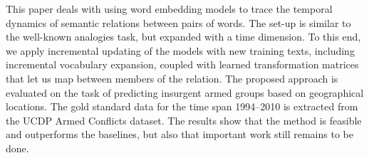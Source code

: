This paper deals with using word embedding models to trace the temporal dynamics of semantic relations between pairs of words. The set-up is similar to the well-known analogies task, but expanded with a time dimension. To this end, we apply incremental updating of the models with new training texts, including incremental vocabulary expansion, coupled with learned transformation matrices that let us map between members of the relation. The proposed approach is evaluated on the task of predicting insurgent armed groups based on geographical locations. The gold standard data for the time span 1994--2010 is extracted from the UCDP Armed Conflicts dataset. The results show that the method is feasible and outperforms the baselines, but also that important work still remains to be done.
